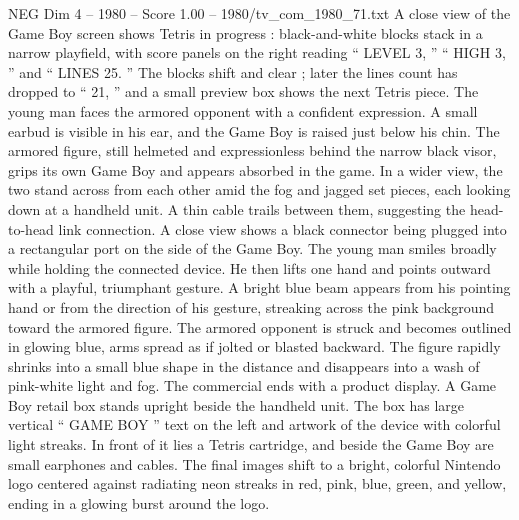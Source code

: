 \begin{textsample}{NEG Dim 4 – 1980 – Score 1.00 – 1980/tv\_com\_1980\_71.txt}
A close view of the Game Boy screen shows Tetris in progress : black-and-white blocks stack in a narrow playfield, with score panels on the right reading “ LEVEL 3, ” “ HIGH 3, ” and “ LINES 25. ” The blocks shift and clear ; later the lines count has dropped to “ 21, ” and a small preview box shows the next Tetris piece.
The young man faces the armored opponent with a confident expression.
A small earbud is visible in his ear, and the Game Boy is raised just below his chin.
The armored figure, still helmeted and expressionless behind the narrow black visor, grips its own Game Boy and appears absorbed in the game.
In a wider view, the two stand across from each other amid the fog and jagged set pieces, each looking down at a handheld unit.
A thin cable trails between them, suggesting the head-to-head link connection.
A close view shows a black connector being plugged into a rectangular port on the side of the Game Boy.
The young man smiles broadly while holding the connected device.
He then lifts one hand and points outward with a playful, triumphant gesture.
A bright blue beam appears from his pointing hand or from the direction of his gesture, streaking across the pink background toward the armored figure.
The armored opponent is struck and becomes outlined in glowing blue, arms spread as if jolted or blasted backward.
The figure rapidly shrinks into a small blue shape in the distance and disappears into a wash of pink-white light and fog.
The commercial ends with a product display.
A Game Boy retail box stands upright beside the handheld unit.
The box has large vertical “ GAME BOY ” text on the left and artwork of the device with colorful light streaks.
In front of it lies a Tetris cartridge, and beside the Game Boy are small earphones and cables.
The final images shift to a bright, colorful Nintendo logo centered against radiating neon streaks in red, pink, blue, green, and yellow, ending in a glowing burst around the logo.

\end{textsample}
